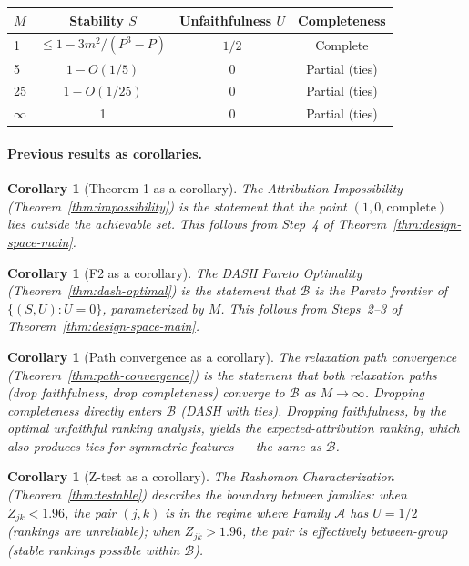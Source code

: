 \documentclass{article}
\newtheorem{corollary}[theorem]{Corollary}
\begin{document}
\begin{center}
\small
\begin{tabular}{@{}lccc@{}}
\toprule
$M$ & Stability $S$ & Unfaithfulness $U$ & Completeness \\
\midrule
1 & $\leq 1 - 3m^2/(P^3{-}P)$ & $1/2$ & Complete \\
5 & $1 - O(1/5)$ & 0 & Partial (ties) \\
25 & $1 - O(1/25)$ & 0 & Partial (ties) \\
$\infty$ & 1 & 0 & Partial (ties) \\
\bottomrule
\end{tabular}
\end{center}

\paragraph{Previous results as corollaries.}

\begin{corollary}[Theorem 1 as a corollary]
The Attribution Impossibility (Theorem~\ref{thm:impossibility}) is the statement that the
point $(1, 0, \text{complete})$ lies outside the achievable set.
This follows from Step~4 of Theorem~\ref{thm:design-space-main}.
\end{corollary}

\begin{corollary}[F2 as a corollary]
The DASH Pareto Optimality (Theorem~\ref{thm:dash-optimal}) is the
statement that $\mathcal{B}$ is the Pareto frontier of
$\{(S, U) : U = 0\}$, parameterized by $M$. This follows from
Steps~2--3 of Theorem~\ref{thm:design-space-main}.
\end{corollary}

\begin{corollary}[Path convergence as a corollary]
The relaxation path convergence (Theorem~\ref{thm:path-convergence})
is the statement that \emph{both} relaxation paths (drop faithfulness,
drop completeness) converge to $\mathcal{B}$ as $M \to \infty$.
Dropping completeness directly enters $\mathcal{B}$ (DASH with ties).
Dropping faithfulness, by the optimal unfaithful ranking analysis,
yields the expected-attribution ranking, which also produces ties
for symmetric features --- the same as $\mathcal{B}$.
\end{corollary}

\begin{corollary}[Z-test as a corollary]
The Rashomon Characterization (Theorem~\ref{thm:testable}) describes
the \emph{boundary between families}: when $Z_{jk} < 1.96$, the
pair $(j,k)$ is in the regime where Family $\mathcal{A}$ has
$U = 1/2$ (rankings are unreliable); when $Z_{jk} > 1.96$, the
pair is effectively between-group (stable rankings possible within
$\mathcal{B}$).
\end{corollary}
\end{document}
